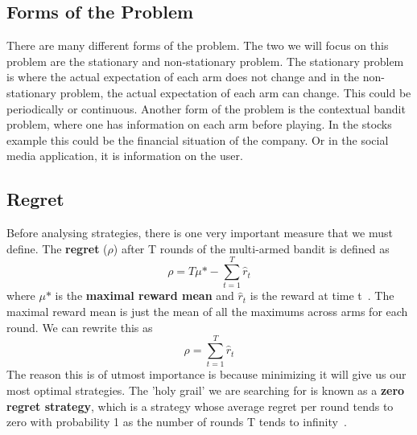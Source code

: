 \subsection{Forms of the Problem}\label{subsec:forms-of-the-problem}
There are many different forms of the problem.
The two we will focus on this problem are the stationary and non-stationary problem.
The stationary problem is where the actual expectation of each arm does not change and in the non-stationary problem, the actual expectation of each arm can change.
This could be periodically or continuous.
Another form of the problem is the contextual bandit problem, where one has information on each arm before playing.
In the stocks example this could be the financial situation of the company.
Or in the social media application, it is information on the user.

\subsection{Regret}\label{subsec:regret}
Before analysing strategies, there is one very important measure that we must define.
The \textbf{regret} ($\rho$) after T rounds of the multi-armed bandit is defined as \[\rho = T\mu\mbox{*} - \sum_{t=1}^T\hat{r}_t\] where $\mu\mbox{*}$ is the \textbf{maximal reward mean} and $\hat{r}_t$ is the reward at time t~\citep{vermorel}.
The maximal reward mean is just the mean of all the maximums across arms for each round.
We can rewrite this as \[\rho = \sum_{t=1}^T\hat{r}_t\] The reason this is of utmost importance is because minimizing it will give us our most optimal strategies.
The 'holy grail' we are searching for is known as a \textbf{zero regret strategy}, which is a strategy whose average regret per round tends to zero with probability 1 as the number of rounds T tends to infinity~\citep{vermorel}.
